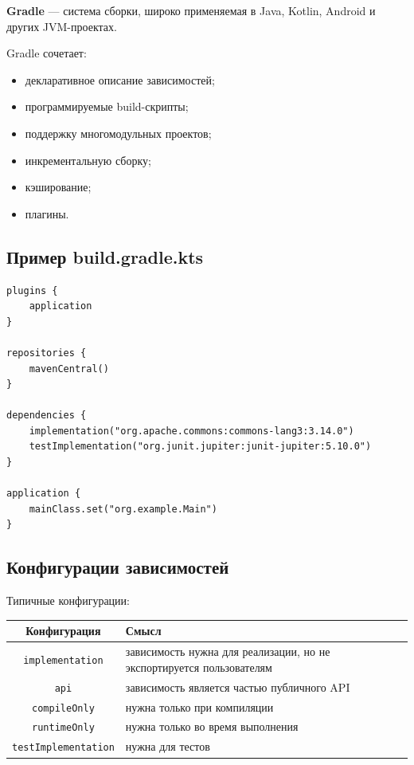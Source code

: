 \documentclass[12pt,a4paper]{article}
\begin{document}
\textbf{Gradle} --- система сборки, широко применяемая в Java, Kotlin, Android и других JVM-проектах.

Gradle сочетает:
\begin{itemize}
    \item декларативное описание зависимостей;
    \item программируемые build-скрипты;
    \item поддержку многомодульных проектов;
    \item инкрементальную сборку;
    \item кэширование;
    \item плагины.
\end{itemize}

\subsection{Пример build.gradle.kts}

\begin{lstlisting}
plugins {
    application
}

repositories {
    mavenCentral()
}

dependencies {
    implementation("org.apache.commons:commons-lang3:3.14.0")
    testImplementation("org.junit.jupiter:junit-jupiter:5.10.0")
}

application {
    mainClass.set("org.example.Main")
}
\end{lstlisting}

\subsection{Конфигурации зависимостей}

Типичные конфигурации:
\begin{center}
\begin{tabular}{|c|p{9cm}|}
\hline
Конфигурация & Смысл \\
\hline
\texttt{implementation} & зависимость нужна для реализации, но не экспортируется пользователям \\
\hline
\texttt{api} & зависимость является частью публичного API \\
\hline
\texttt{compileOnly} & нужна только при компиляции \\
\hline
\texttt{runtimeOnly} & нужна только во время выполнения \\
\hline
\texttt{testImplementation} & нужна для тестов \\
\hline
\end{tabular}
\end{center}
\end{document}

